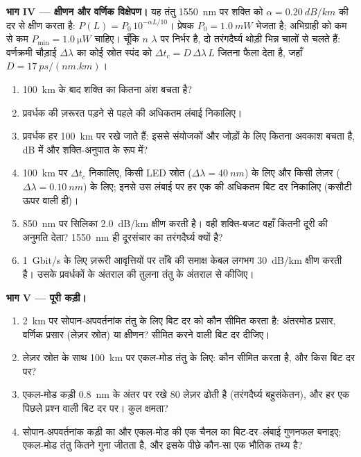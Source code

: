 \begin{problem}
\medskip
\noindent\textbf{भाग IV --- क्षीणन और वर्णिक विक्षेपण।}
यह तंतु \qty{1550}{nm} पर शक्ति को $\alpha = \qty{0.20}{dB/km}$ की दर से
क्षीण करता है: $P(L) = P_0\,10^{-\alpha L/10}$। प्रेषक
$P_0 = \qty{1.0}{mW}$ भेजता है; अभिग्राही को कम से कम
$P_{\min} = \qty{1.0}{\micro W}$ चाहिए। चूँकि $n$ $\lambda$ पर निर्भर है,
दो तरंगदैर्घ्य थोड़ी भिन्न चालों से चलते हैं: वर्णक्रमी चौड़ाई
$\Delta\lambda$ का कोई स्रोत स्पंद को $\Delta t_c = D\,\Delta\lambda\,L$
जितना फैला देता है, जहाँ $D = \qty{17}{ps/(nm.km)}$।
\begin{enumerate}[resume]
  \item \qty{100}{km} के बाद शक्ति का कितना अंश बचता है?
  \item प्रवर्धक की ज़रूरत पड़ने से पहले की अधिकतम लंबाई निकालिए।
  \item प्रवर्धक हर \qty{100}{km} पर रखे जाते हैं: इससे संयोजकों और जोड़ों
        के लिए कितना अवकाश बचता है, dB में और शक्ति-अनुपात के रूप में?
  \item \qty{100}{km} पर $\Delta t_c$ निकालिए, किसी LED स्रोत
        ($\Delta\lambda = \qty{40}{nm}$) के लिए और किसी लेज़र
        ($\Delta\lambda = \qty{0.10}{nm}$) के लिए; इनसे उस लंबाई पर हर एक की अधिकतम बिट दर
        निकालिए (कसौटी ऊपर वाली ही)।
  \item \qty{850}{nm} पर सिलिका \qty{2.0}{dB/km} क्षीण करती है। वही
        शक्ति-बजट वहाँ कितनी दूरी की अनुमति देता? \qty{1550}{nm} ही
        दूरसंचार का तरंगदैर्घ्य क्यों है?
  \item \qty{1}{Gbit/s} के लिए ज़रूरी आवृत्तियों पर ताँबे की समाक्ष केबल
        लगभग \qty{30}{dB/km} क्षीण करती है। उसके प्रवर्धकों के अंतराल की
        तुलना तंतु के अंतराल से कीजिए।
\end{enumerate}

\medskip
\noindent\textbf{भाग V --- पूरी कड़ी।}
\begin{enumerate}[resume]
  \item \qty{2}{km} पर सोपान-अपवर्तनांक तंतु के लिए बिट दर को कौन सीमित
        करता है: अंतरमोड प्रसार, वर्णिक प्रसार (लेज़र स्रोत) या क्षीणन?
        सीमित करने वाली बिट दर दीजिए।
  \item लेज़र स्रोत के साथ \qty{100}{km} पर एकल-मोड तंतु के लिए: कौन सीमित
        करता है, और किस बिट दर पर?
  \item एकल-मोड कड़ी \qty{0.8}{nm} के अंतर पर रखे $80$ लेज़र ढोती है
        (तरंगदैर्घ्य बहुसंकेतन), और हर एक पिछले प्रश्न वाली बिट दर पर।
        कुल क्षमता?
  \item सोपान-अपवर्तनांक कड़ी का और एकल-मोड की एक चैनल का बिट-दर--लंबाई
        गुणनफल बनाइए; एकल-मोड तंतु कितने गुना जीतता है, और इसके पीछे कौन-सा
        एक भौतिक तथ्य है?
\end{enumerate}
\end{problem}

